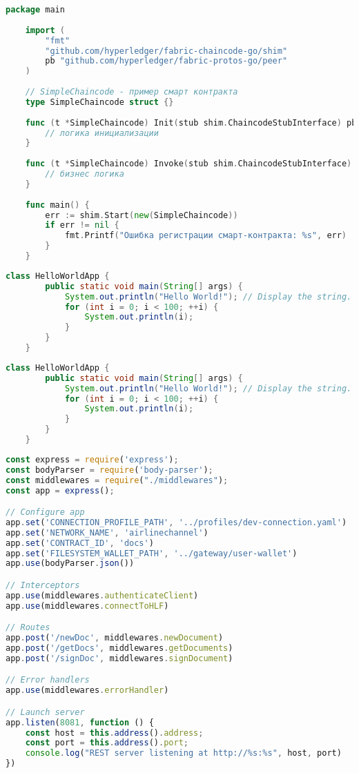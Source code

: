 \begin{lstlisting}[caption={Реализация Chaincode},label={lst:chaincode-impl},language=Go]
	package main
	
	import (
		"fmt"
		"github.com/hyperledger/fabric-chaincode-go/shim"
		pb "github.com/hyperledger/fabric-protos-go/peer"
	)
	
	// SimpleChaincode - пример смарт контракта
	type SimpleChaincode struct {}
	
	func (t *SimpleChaincode) Init(stub shim.ChaincodeStubInterface) pb.Response {
		// логика инициализации
	}
	
	func (t *SimpleChaincode) Invoke(stub shim.ChaincodeStubInterface) pb.Response {
		// бизнес логика
	}
	
	func main() {
		err := shim.Start(new(SimpleChaincode))
		if err != nil {
			fmt.Printf("Ошибка регистрации смарт-контракта: %s", err)
		}
	}
\end{lstlisting}

\begin{lstlisting}[caption={Sample Java},label={lst:sample-java},language=Java]
	class HelloWorldApp {
		public static void main(String[] args) {
			System.out.println("Hello World!"); // Display the string.
			for (int i = 0; i < 100; ++i) {
				System.out.println(i);
			}
		}
	}
\end{lstlisting}

\begin{lstlisting}[caption={Sample Java},label={lst:sample-java},language=Java]
	class HelloWorldApp {
		public static void main(String[] args) {
			System.out.println("Hello World!"); // Display the string.
			for (int i = 0; i < 100; ++i) {
				System.out.println(i);
			}
		}
	}
\end{lstlisting}

\begin{lstlisting}[caption={Sample JavaScript},label={lst:sample-java-script},language=JavaScript]
const express = require('express');
const bodyParser = require('body-parser');
const middlewares = require("./middlewares");
const app = express();

// Configure app
app.set('CONNECTION_PROFILE_PATH', '../profiles/dev-connection.yaml')
app.set('NETWORK_NAME', 'airlinechannel')
app.set('CONTRACT_ID', 'docs')
app.set('FILESYSTEM_WALLET_PATH', '../gateway/user-wallet')
app.use(bodyParser.json())

// Interceptors
app.use(middlewares.authenticateClient)
app.use(middlewares.connectToHLF)

// Routes
app.post('/newDoc', middlewares.newDocument)
app.post('/getDocs', middlewares.getDocuments)
app.post('/signDoc', middlewares.signDocument)

// Error handlers
app.use(middlewares.errorHandler)

// Launch server
app.listen(8081, function () {
	const host = this.address().address;
	const port = this.address().port;
	console.log("REST server listening at http://%s:%s", host, port)
})
\end{lstlisting}

